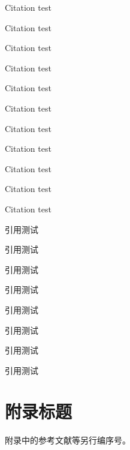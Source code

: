 \documentclass[degree=doctor]{thuthesis}
\begin{document}
\START
\showoutput

Citation \cite{crane1972invisible} test\par
Citation \cite{baker1995future} test\par
Citation \cite{jha2004effect} test\par

Citation \citet{baker1995future} test\par
Citation \citet[42]{baker1995future} test\par
Citation \citep{baker1995future} test\par
Citation \citep[42]{baker1995future} test\par
Citation \citep[see][]{baker1995future} test\par
Citation \citep[see][42]{baker1995future} test\par
Citation \citet*{baker1995future} test\par
Citation \citep*{baker1995future} test\par

引用\citet{wangbing1997dianzi}测试\par
引用\citet[42]{wangbing1997dianzi}测试\par
引用\citep{wangbing1997dianzi}测试\par
引用\citep[42]{wangbing1997dianzi}测试\par
引用\citep[见][]{wangbing1997dianzi}测试\par
引用\citep[见][42]{wangbing1997dianzi}测试\par
引用\citet*{wangbing1997dianzi}测试\par
引用\citep*{wangbing1997dianzi}测试\par

\nocite{*}

\printbibliography

\appendix
\chapter{附录标题}
附录中的参考文献等另行编序号\cite{baker1995future,crane1972invisible}。
\printbibliography

\clearpage
\OMIT
\end{document}
